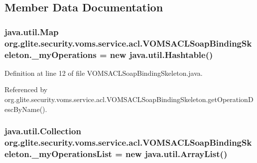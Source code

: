 \subsection{Member Data Documentation}
\hypertarget{classorg_1_1glite_1_1security_1_1voms_1_1service_1_1acl_1_1VOMSACLSoapBindingSkeleton_a5e446779a0bf30fd5362fae659d912f8}{
\subsubsection[{\_\-myOperations}]{\setlength{\rightskip}{0pt plus 5cm}java.util.Map {\bf org.glite.security.voms.service.acl.VOMSACLSoapBindingSkeleton.\_\-myOperations} = new java.util.Hashtable()}}
\label{classorg_1_1glite_1_1security_1_1voms_1_1service_1_1acl_1_1VOMSACLSoapBindingSkeleton_a5e446779a0bf30fd5362fae659d912f8}


Definition at line 12 of file VOMSACLSoapBindingSkeleton.java.



Referenced by org.glite.security.voms.service.acl.VOMSACLSoapBindingSkeleton.getOperationDescByName().

\hypertarget{classorg_1_1glite_1_1security_1_1voms_1_1service_1_1acl_1_1VOMSACLSoapBindingSkeleton_a28b80683df4e969e98c4cdaaf4135b94}{
\subsubsection[{\_\-myOperationsList}]{\setlength{\rightskip}{0pt plus 5cm}java.util.Collection {\bf org.glite.security.voms.service.acl.VOMSACLSoapBindingSkeleton.\_\-myOperationsList} = new java.util.ArrayList()}}
\label{classorg_1_1glite_1_1security_1_1voms_1_1service_1_1acl_1_1VOMSACLSoapBindingSkeleton_a28b80683df4e969e98c4cdaaf4135b94}


